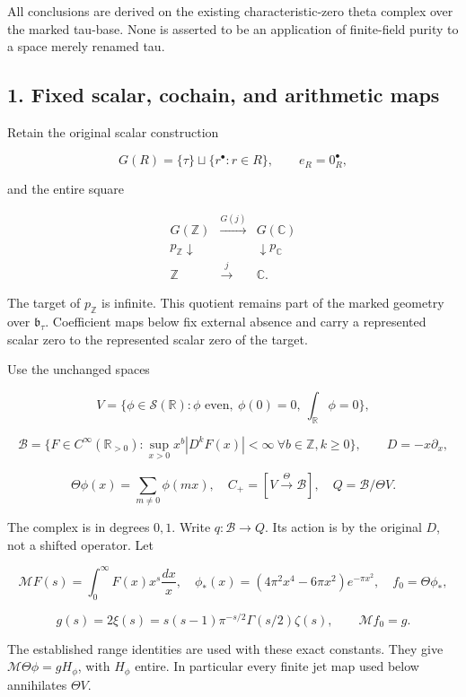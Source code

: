 \documentclass[
]{article}
\begin{document}
All conclusions are derived on the existing characteristic-zero theta
complex over the marked tau-base. None is asserted to be an application
of finite-field purity to a space merely renamed tau.

\subsection{1. Fixed scalar, cochain, and arithmetic
maps}\label{fixed-scalar-cochain-and-arithmetic-maps}

Retain the original scalar construction

\[G(R)=\{\tau\}\sqcup\{r^\bullet:r\in R\},\qquad e_R=0_R^\bullet,\]

and the entire square

\[\boxed{\begin{array}{ccc}
G(\mathbb Z)&\xrightarrow{G(j)}&G(\mathbb C)\\
p_{\mathbb Z}\downarrow&&\downarrow p_{\mathbb C}\\
\mathbb Z&\xrightarrow{j}&\mathbb C.
\end{array}}\tag{1.1}\]

The target of \(p_{\mathbb Z}\) is infinite. This quotient remains part
of the marked geometry over \(\mathfrak b_\tau\). Coefficient maps below
fix external absence and carry a represented scalar zero to the
represented scalar zero of the target.

Use the unchanged spaces

\[V=\{\phi\in\mathcal S(\mathbb R):\phi\text{ even},\ \phi(0)=0,\ \int_{\mathbb R}\phi=0\},\]

\[\mathscr B=\{F\in C^\infty(\mathbb R_{>0}):\sup_{x>0}x^b|D^kF(x)|<\infty\ \forall b\in\mathbb Z,k\ge0\},\qquad D=-x\partial_x,\]

\[\Theta\phi(x)=\sum_{m\ne0}\phi(mx),\quad C_+=[V\xrightarrow{\Theta}\mathscr B],\quad Q=\mathscr B/\Theta V.\]

The complex is in degrees \(0,1\). Write \(q:\mathscr B\to Q\). Its
action is by the original \(D\), not a shifted operator. Let

\[\mathcal MF(s)=\int_0^\infty F(x)x^s\frac{dx}{x},\quad
\phi_*(x)=(4\pi^2x^4-6\pi x^2)e^{-\pi x^2},\quad f_0=\Theta\phi_*,\]

\[g(s)=2\xi(s)=s(s-1)\pi^{-s/2}\Gamma(s/2)\zeta(s),\qquad\mathcal Mf_0=g.\tag{1.2}\]

The established range identities are used with these exact constants.
They give \(\mathcal M\Theta\phi=gH_\phi\), with \(H_\phi\) entire. In
particular every finite jet map used below annihilates \(\Theta V\).
\end{document}
